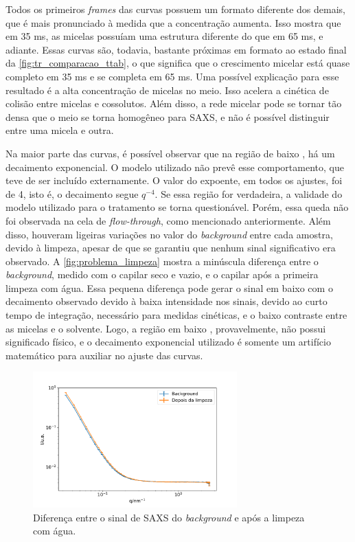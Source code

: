 	
	Todos os primeiros \emph{frames} das curvas possuem um formato diferente dos demais, que é mais pronunciado à medida que a concentração aumenta. Isso mostra que em 35 ms, as micelas possuíam uma estrutura diferente do que em 65 ms, e adiante. Essas curvas são, todavia, bastante próximas em formato ao estado final da \autoref{fig:tr_comparacao_ttab}, o que significa que o crescimento micelar está quase completo em 35 ms e se completa em 65 ms. Uma possível explicação para esse resultado é a alta concentração de micelas no meio. Isso acelera a cinética de colisão entre micelas e cossolutos. Além disso, a rede micelar pode se tornar tão densa que o meio se torna homogêneo para SAXS, e não é possível distinguir entre uma micela e outra.
	
	Na maior parte das curvas, é possível observar que na região de baixo \q, há um decaimento exponencial. O modelo utilizado não prevê esse comportamento, que teve de ser incluído externamente. O valor do expoente, em todos os ajustes, foi de 4, isto é, o decaimento segue \( q^{-4} \). Se essa região for verdadeira, a validade do modelo utilizado para o tratamento se torna questionável. Porém, essa queda não foi observada na cela de \emph{flow-through}, como mencionado anteriormente. Além disso, houveram ligeiras variações no valor do \emph{background} entre cada amostra, devido à limpeza, apesar de que se garantiu que nenhum sinal significativo era observado. A \autoref{fig:problema_limpeza} mostra a minúscula diferença entre o \emph{background}, medido com o capilar seco e vazio, e o capilar após a primeira limpeza com água. Essa pequena diferença pode gerar o sinal em baixo \q{} com o decaimento observado devido à baixa intensidade nos sinais, devido ao curto tempo de integração, necessário para medidas cinéticas, e o baixo contraste entre as micelas e o solvente. Logo, a região em baixo \q{}, provavelmente, não possui significado físico, e o decaimento exponencial utilizado é somente um artifício matemático para auxiliar no ajuste das curvas.
	
	\begin{figure}[h]
		\centering
		\includegraphics[width=0.7\textwidth]{imagens/saxs/problema_limpeza}
		\caption{Diferença entre o sinal de SAXS do \emph{background} e após a limpeza com água.}
		\label{fig:problema_limpeza}
	\end{figure}

